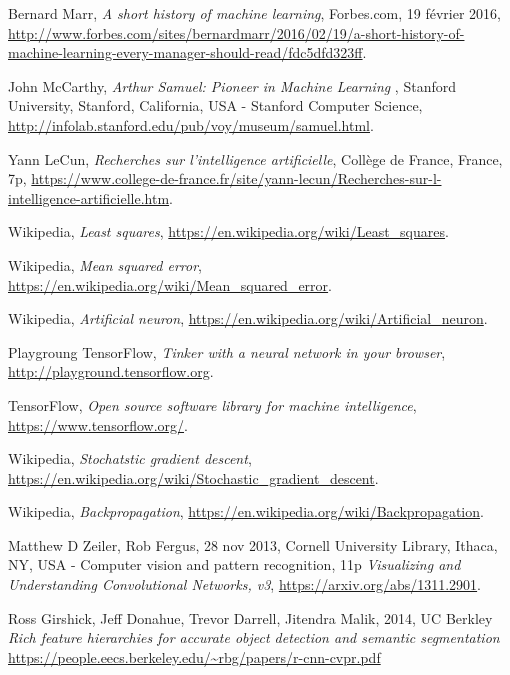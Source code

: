\begin{thebibliography}{9}

  Bernard Marr,
  \emph{A short history of machine learning},
  Forbes.com, 19 février 2016,
  \url{http://www.forbes.com/sites/bernardmarr/2016/02/19/a-short-history-of-machine-learning-every-manager-should-read/fdc5dfd323ff}.

  John McCarthy,
  \emph{Arthur Samuel: Pioneer in Machine Learning },
  Stanford University, Stanford, California, USA -
  Stanford Computer Science,
  \url{http://infolab.stanford.edu/pub/voy/museum/samuel.html}.

  Yann LeCun,
  \emph{Recherches sur l'intelligence artificielle},
  Collège de France, France,
  7p,
  \url{https://www.college-de-france.fr/site/yann-lecun/Recherches-sur-l-intelligence-artificielle.htm}.

  Wikipedia, \emph{Least squares},
  \url{https://en.wikipedia.org/wiki/Least_squares}.

  Wikipedia,
  \emph{Mean squared error},
  \url{https://en.wikipedia.org/wiki/Mean_squared_error}.

  Wikipedia,
  \emph{Artificial neuron},
  \url{https://en.wikipedia.org/wiki/Artificial_neuron}.

  Playgroung TensorFlow,
  \emph{Tinker with a neural network in your browser},
  \url{http://playground.tensorflow.org}.

  TensorFlow,
  \emph{Open source software library for machine intelligence},
  \url{https://www.tensorflow.org/}.

  Wikipedia,
  \emph{Stochatstic gradient descent},
  \url{https://en.wikipedia.org/wiki/Stochastic_gradient_descent}.

  Wikipedia,
  \emph{Backpropagation},
  \url{https://en.wikipedia.org/wiki/Backpropagation}.

  Matthew D Zeiler, Rob Fergus,
  28 nov 2013,
  Cornell University Library, Ithaca, NY, USA -
  Computer vision and pattern recognition,
  11p
  \emph{Visualizing and Understanding Convolutional Networks, v3},
  \url{https://arxiv.org/abs/1311.2901}.


  Ross Girshick, Jeff Donahue, Trevor Darrell, Jitendra Malik,
  2014, 
  UC Berkley
  \emph{Rich feature hierarchies for accurate object detection and semantic segmentation}
  \url{https://people.eecs.berkeley.edu/~rbg/papers/r-cnn-cvpr.pdf}
    

\end{thebibliography}
